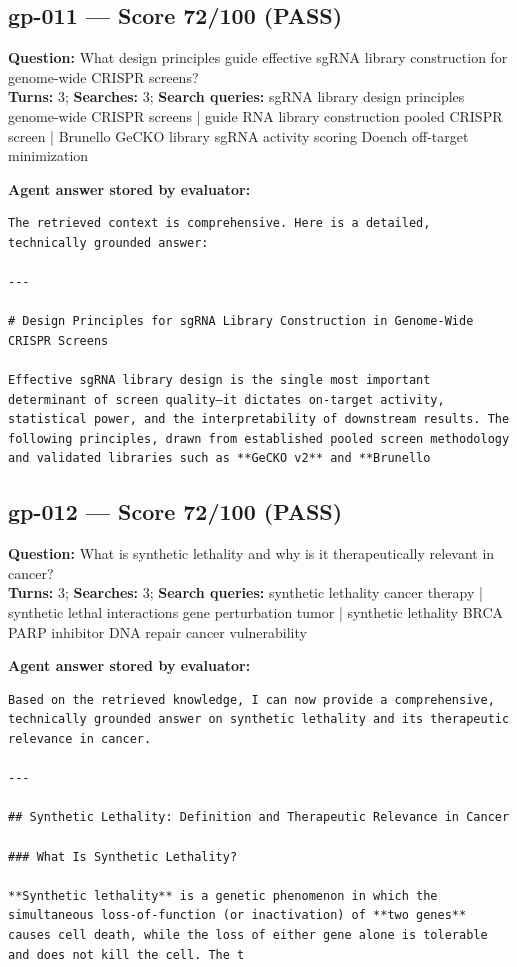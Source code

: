 \documentclass[12pt, a4paper]{article}
\begin{document}
\subsection*{gp-011 --- Score 72/100 (PASS)}
\noindent\textbf{Question:} What design principles guide effective sgRNA library construction for genome-wide CRISPR screens?\\
\textbf{Turns:} 3; \textbf{Searches:} 3; \textbf{Search queries:} sgRNA library design principles genome-wide CRISPR screens | guide RNA library construction pooled CRISPR screen | Brunello GeCKO library sgRNA activity scoring Doench off-target minimization

\noindent\textbf{Agent answer stored by evaluator:}
\begin{lstlisting}[numbers=none]
The retrieved context is comprehensive. Here is a detailed, technically grounded answer:

---

# Design Principles for sgRNA Library Construction in Genome-Wide CRISPR Screens

Effective sgRNA library design is the single most important determinant of screen quality—it dictates on-target activity, statistical power, and the interpretability of downstream results. The following principles, drawn from established pooled screen methodology and validated libraries such as **GeCKO v2** and **Brunello
\end{lstlisting}

\subsection*{gp-012 --- Score 72/100 (PASS)}
\noindent\textbf{Question:} What is synthetic lethality and why is it therapeutically relevant in cancer?\\
\textbf{Turns:} 3; \textbf{Searches:} 3; \textbf{Search queries:} synthetic lethality cancer therapy | synthetic lethal interactions gene perturbation tumor | synthetic lethality BRCA PARP inhibitor DNA repair cancer vulnerability

\noindent\textbf{Agent answer stored by evaluator:}
\begin{lstlisting}[numbers=none]
Based on the retrieved knowledge, I can now provide a comprehensive, technically grounded answer on synthetic lethality and its therapeutic relevance in cancer.

---

## Synthetic Lethality: Definition and Therapeutic Relevance in Cancer

### What Is Synthetic Lethality?

**Synthetic lethality** is a genetic phenomenon in which the simultaneous loss-of-function (or inactivation) of **two genes** causes cell death, while the loss of either gene alone is tolerable and does not kill the cell. The t
\end{lstlisting}
\end{document}
